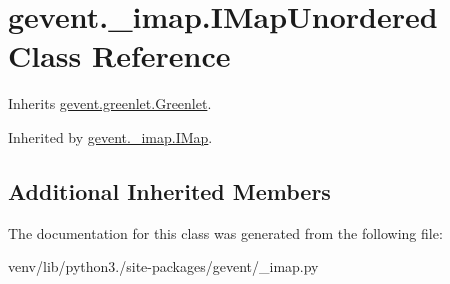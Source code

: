 \hypertarget{classgevent_1_1__imap_1_1_i_map_unordered}{}\section{gevent.\+\_\+imap.\+I\+Map\+Unordered Class Reference}
\label{classgevent_1_1__imap_1_1_i_map_unordered}


Inherits \hyperlink{classgevent_1_1greenlet_1_1_greenlet}{gevent.\+greenlet.\+Greenlet}.



Inherited by \hyperlink{classgevent_1_1__imap_1_1_i_map}{gevent.\+\_\+imap.\+I\+Map}.

\subsection*{Additional Inherited Members}


The documentation for this class was generated from the following file\+:\begin{DoxyCompactItemize}
\item 
venv/lib/python3./site-\/packages/gevent/\+\_\+imap.\+py\end{DoxyCompactItemize}
